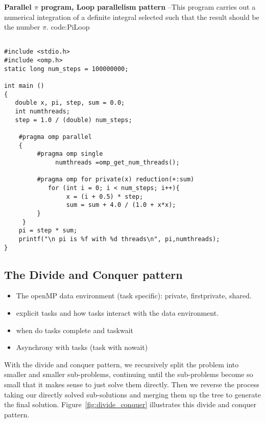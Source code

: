 \begin{CodeExample}%
{\textbf{Parallel $\pi$ program, Loop parallelism pattern} --\small This program carries out a numerical integration 
of a definite integral selected such that the result should be the number $\pi$.
}%
{code:PiLoop}
\begin{lstlisting}

#include <stdio.h>
#include <omp.h>
static long num_steps = 100000000;

int main ()
{
   double x, pi, step, sum = 0.0;
   int numthreads;
   step = 1.0 / (double) num_steps;

    #pragma omp parallel  
    {
         #pragma omp single
              numthreads =omp_get_num_threads();

         #pragma omp for private(x) reduction(+:sum) 
            for (int i = 0; i < num_steps; i++){
                 x = (i + 0.5) * step;
                 sum = sum + 4.0 / (1.0 + x*x);
	     }
     }
    pi = step * sum;
    printf("\n pi is %f with %d threads\n", pi,numthreads);
}	  
\end{lstlisting}
\end{CodeExample}


\subsection{The Divide and Conquer pattern}
\label{sec:patternsDivCon}

\begin{itemize}
\item The openMP data environment (task specific): private, firstprivate, shared.  
\item explicit tasks and how tasks interact with the data environment.
\item when do tasks complete and taskwait
\item Asynchrony with tasks (task with nowait)
\end{itemize}



With the divide and conquer pattern, we recursively split the problem into smaller and smaller sub-problems,
continuing until the sub-problems become so small that it makes sense to just solve them directly.
Then we reverse the process taking our directly solved sub-solutions and merging them up the tree
to generate the final solution. 
Figure~\ref{fig:divide_conquer} illustrates this divide and conquer pattern.   

